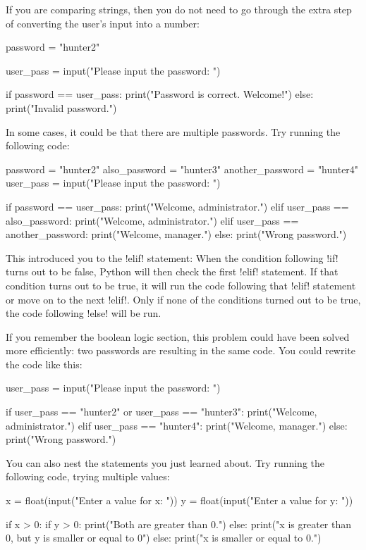 \documentclass[11pt]{cselabheader}
\begin{document}
If you are comparing strings, then you do not need to go through the extra step
of converting the user's input into a number:

\begin{python3code}
password = "hunter2"

user_pass = input("Please input the password: ")

if password == user_pass:
    print("Password is correct. Welcome!")
else:
    print("Invalid password.")
\end{python3code}

In some cases, it could be that there are multiple passwords. Try running the
following code:

\begin{python3code}
password = "hunter2"
also_password = "hunter3"
another_password = "hunter4"
user_pass = input("Please input the password: ")

if password == user_pass:
    print("Welcome, administrator.")
elif user_pass == also_password:
    print("Welcome, administrator.")
elif user_pass == another_password:
    print("Welcome, manager.")
else:
    print("Wrong password.")
\end{python3code}

This introduced you to the \pythoninline!elif! statement: When the condition
following \pythoninline!if! turns out to be false, Python will then check the first
\pythoninline!elif! statement. If that condition turns out to be true, it will run
the code following that \pythoninline!elif! statement or move on to the next
\pythoninline!elif!. Only if none of the conditions turned out to be true, the code
following \pythoninline!else! will be run.

If you remember the boolean logic section, this problem could have been solved
more efficiently: two passwords are resulting in the same code. You could
rewrite the code like this:

\begin{python3code}
user_pass = input("Please input the password: ")

if user_pass == "hunter2" or user_pass == "hunter3":
    print("Welcome, administrator.")
elif user_pass == "hunter4":
    print("Welcome, manager.")
else:
    print("Wrong password.")
\end{python3code}

You can also nest the statements you just learned about. Try running the
following code, trying multiple values:

\begin{python3code}
x = float(input("Enter a value for x: "))
y = float(input("Enter a value for y: "))

if x > 0:
    if y > 0:
        print("Both are greater than 0.")
    else:
        print("x is greater than 0, but y is smaller or equal to 0")
else:
    print("x is smaller or equal to 0.")
\end{python3code}
\end{document}
